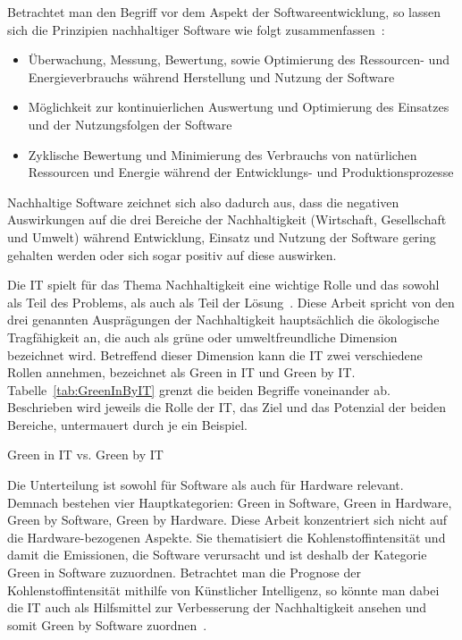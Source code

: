 Betrachtet man den Begriff vor dem Aspekt der Softwareentwicklung, so lassen sich die Prinzipien nachhaltiger Software wie folgt zusammenfassen~\cite{Calero.2015}:
\begin{itemize}
 \item Überwachung, Messung, Bewertung, sowie Optimierung des Ressourcen- und Energieverbrauchs während Herstellung und Nutzung der Software
\item Möglichkeit zur kontinuierlichen Auswertung und Optimierung des Einsatzes und der Nutzungsfolgen der Software
\item Zyklische Bewertung und Minimierung des Verbrauchs von natürlichen Ressourcen und Energie während der Entwicklungs- und Produktionsprozesse
\end{itemize}
Nachhaltige Software zeichnet sich also dadurch aus, dass die negativen Auswirkungen auf die drei Bereiche der Nachhaltigkeit (Wirtschaft, Gesellschaft und Umwelt) während Entwicklung, Einsatz und Nutzung der Software gering gehalten werden oder sich sogar positiv auf diese auswirken.

Die IT spielt für das Thema Nachhaltigkeit eine wichtige Rolle und das sowohl als Teil des Problems, als auch als Teil der Lösung~\cite{Calero.2015}.
Diese Arbeit spricht von den drei genannten Ausprägungen der Nachhaltigkeit hauptsächlich die ökologische Tragfähigkeit an, die auch als \glqq grüne\grqq{} oder \glqq umweltfreundliche\grqq{} Dimension bezeichnet wird.
Betreffend dieser Dimension kann die IT zwei verschiedene Rollen annehmen, bezeichnet als Green in IT und Green by IT\@.
Tabelle~\ref{tab:GreenInByIT} grenzt die beiden Begriffe voneinander ab.
Beschrieben wird jeweils die Rolle der IT, das Ziel und das Potenzial der beiden Bereiche, untermauert durch je ein Beispiel.

\begin{table}[t]
 \centering\small
 \caption{Green in IT vs. Green by IT}
 \label{tab:GreenInByIT}
 
\end{table}

Die Unterteilung ist sowohl für Software als auch für Hardware relevant.
Demnach bestehen vier Hauptkategorien:
Green in Software, Green in Hardware, Green by Software, Green by Hardware.
Diese Arbeit konzentriert sich nicht auf die Hardware-bezogenen Aspekte.
Sie thematisiert die Kohlenstoffintensität und damit die Emissionen, die Software verursacht und ist deshalb der Kategorie Green in Software zuzuordnen.
Betrachtet man die Prognose der Kohlenstoffintensität mithilfe von Künstlicher Intelligenz, so könnte man dabei die IT auch als Hilfsmittel zur Verbesserung der Nachhaltigkeit ansehen und somit Green by Software zuordnen~\cite{Calero.2015}.

